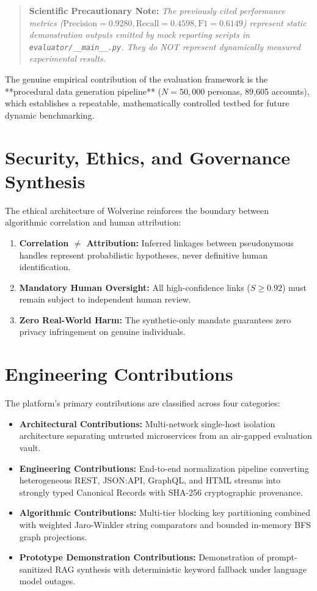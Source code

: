 \begin{quote}
\textbf{Scientific Precautionary Note:} \textit{The previously cited performance metrics ($\text{Precision} = 0.9280, \text{Recall} = 0.4598, \text{F1} = 0.6149$) represent static demonstration outputs emitted by mock reporting scripts in \texttt{evaluator/\_\_main\_\_.py}. They do NOT represent dynamically measured experimental results.}
\end{quote}

The genuine empirical contribution of the evaluation framework is the **procedural data generation pipeline** ($N = 50{,}000$ personas, 89,605 accounts), which establishes a repeatable, mathematically controlled testbed for future dynamic benchmarking.

\section{Security, Ethics, and Governance Synthesis}
\label{sec:disc-security-ethics}
The ethical architecture of Wolverine reinforces the boundary between algorithmic correlation and human attribution:
\begin{enumerate}
    \item \textbf{Correlation $\neq$ Attribution:} Inferred linkages between pseudonymous handles represent probabilistic hypotheses, never definitive human identification.
    \item \textbf{Mandatory Human Oversight:} All high-confidence links ($S \ge 0.92$) must remain subject to independent human review.
    \item \textbf{Zero Real-World Harm:} The synthetic-only mandate guarantees zero privacy infringement on genuine individuals.
\end{enumerate}

\section{Engineering Contributions}
\label{sec:disc-contributions}
The platform's primary contributions are classified across four categories:
\begin{itemize}
    \item \textbf{Architectural Contributions:} Multi-network single-host isolation architecture separating untrusted microservices from an air-gapped evaluation vault.
    \item \textbf{Engineering Contributions:} End-to-end normalization pipeline converting heterogeneous REST, JSON:API, GraphQL, and HTML streams into strongly typed Canonical Records with SHA-256 cryptographic provenance.
    \item \textbf{Algorithmic Contributions:} Multi-tier blocking key partitioning combined with weighted Jaro-Winkler string comparators and bounded in-memory BFS graph projections.
    \item \textbf{Prototype Demonstration Contributions:} Demonstration of prompt-sanitized RAG synthesis with deterministic keyword fallback under language model outages.
\end{itemize}

